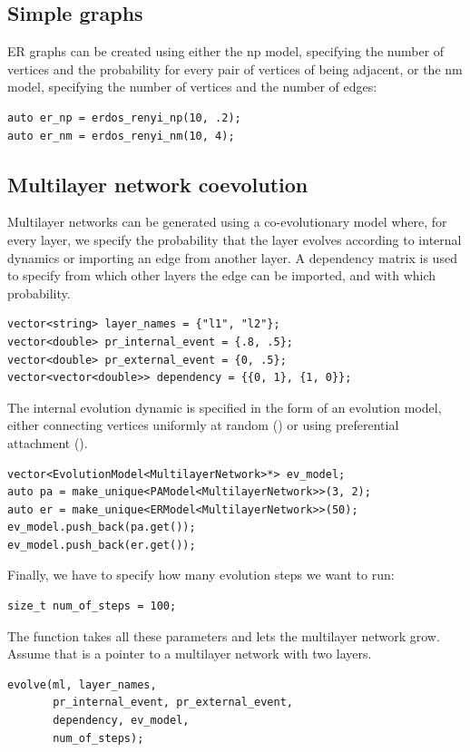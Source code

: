 \subsection{Simple graphs}

ER graphs can be created using either the np model, specifying the number of vertices and the probability for every pair of vertices of being adjacent, or the nm model, specifying the number of vertices and the number of edges:
\begin{lstlisting}[style=c++]
auto er_np = erdos_renyi_np(10, .2);
auto er_nm = erdos_renyi_nm(10, 4); 
\end{lstlisting}

\subsection{Multilayer network coevolution}

Multilayer networks can be generated using a co-evolutionary model where, for every layer, we specify the probability that the layer evolves according to internal dynamics or importing an edge from another layer. A dependency matrix is used to specify from which other layers the edge can be imported, and with which probability.
\begin{lstlisting}[style=c++]
vector<string> layer_names = {"l1", "l2"};
vector<double> pr_internal_event = {.8, .5};
vector<double> pr_external_event = {0, .5};
vector<vector<double>> dependency = {{0, 1}, {1, 0}};
\end{lstlisting}
The internal evolution dynamic is specified in the form of an evolution model, either connecting vertices uniformly at random () or using preferential attachment ().
\begin{lstlisting}[style=c++]
vector<EvolutionModel<MultilayerNetwork>*> ev_model;
auto pa = make_unique<PAModel<MultilayerNetwork>>(3, 2);
auto er = make_unique<ERModel<MultilayerNetwork>>(50);
ev_model.push_back(pa.get());
ev_model.push_back(er.get());
\end{lstlisting}
Finally, we have to specify how many evolution steps we want to run:
\begin{lstlisting}[style=c++]
size_t num_of_steps = 100;
\end{lstlisting}
    
The function  takes all these parameters and lets the multilayer network grow. Assume that  is a pointer to a multilayer network with two layers.
\begin{lstlisting}[style=c++]
evolve(ml, layer_names,
       pr_internal_event, pr_external_event, 
       dependency, ev_model,
       num_of_steps);
\end{lstlisting}

